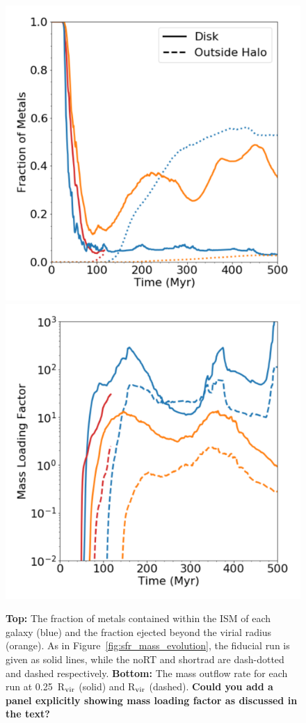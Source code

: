\documentclass[twocolumn]{aastex62}
\begin{document}
\begin{figure}
\centering
\includegraphics[width=0.95\linewidth]{metal_retention}\\
\includegraphics[width=0.95\linewidth]{mass_loading_comparison}
\caption{{\bf Top:} The fraction of metals contained within the ISM of each galaxy (blue) and the fraction ejected beyond the virial radius (orange). As in Figure~\ref{fig:sfr_mass_evolution}, the fiducial run is given as solid lines, while the noRT and shortrad are dash-dotted and dashed respectively. {\bf Bottom:} The mass outflow rate for each run at 0.25~R$_{\rm vir}$ (solid) and R$_{\rm vir}$ (dashed).
   {\bf Could you add a panel explicitly showing mass loading factor as discussed in the text?}
}
\label{fig:metal_retention}
\end{figure}
\end{document}

